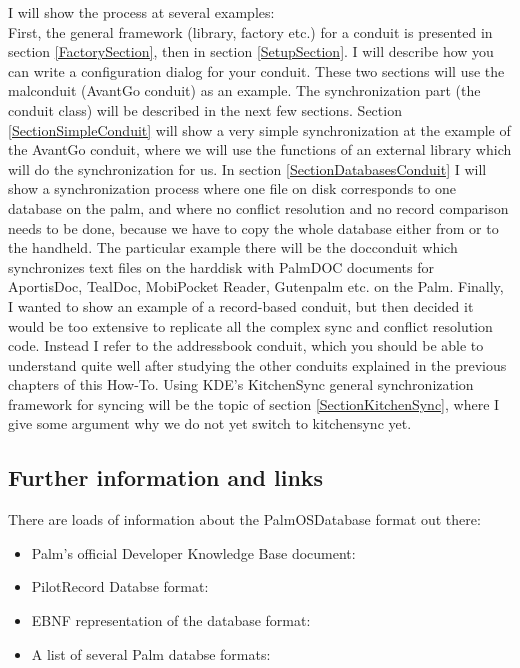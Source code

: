 \documentclass[10pt,a4paper]{article}
\begin{document}
I will show the process at several examples: \\
First, the general framework (library, factory etc.) for a conduit is presented 
in section \ref{FactorySection}, then in section \ref{SetupSection}. 
I will describe how you can write a configuration dialog for your conduit. These 
two sections will use the malconduit (AvantGo conduit) as an example. 
The synchronization part (the conduit class) will be described in the next few 
sections. Section \ref{SectionSimpleConduit} will show a very simple 
synchronization at the example of the AvantGo conduit, where we will use the 
functions of an external library which will do the synchronization for us. 
In section \ref{SectionDatabasesConduit} I will show a synchronization process 
where one file on disk corresponds to one database on the palm, and where no conflict 
resolution and no record comparison needs to be done, because we have to copy the 
whole database either from or to the handheld. The particular example there will be the docconduit which 
synchronizes text files on the harddisk with PalmDOC documents for AportisDoc, TealDoc, MobiPocket Reader, Gutenpalm etc. 
on the Palm.
Finally, I wanted to show an example of a record-based conduit, but then decided it 
would be too extensive to replicate all the complex sync and conflict resolution code.
Instead I refer to the addressbook conduit, which you should be able to understand 
quite well after studying the other conduits explained in the previous chapters of this How-To.
Using KDE's KitchenSync general synchronization framework for syncing will be the topic of section 
\ref{SectionKitchenSync}, where I give some argument why we do not yet switch to kitchensync yet.

\subsection{Further information and links}

There are loads of information about the PalmOS\texttrademark Database format 
out there:
\begin{itemize}
\item Palm's official Developer Knowledge Base document: 
\item PilotRecord Databse format: 
\item EBNF representation of the database format: 
\item A list of several Palm databse formats: 
\end{itemize}
\end{document}
